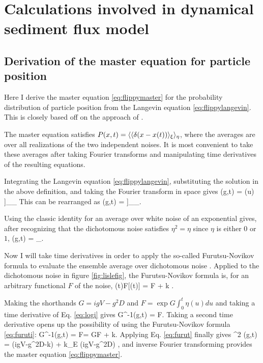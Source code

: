 
\chapter{Calculations involved in dynamical sediment flux model}
\label{sec:appendixAfluc}
\section{Derivation of the master equation for particle position}
\label{sec:appAmaster}
Here I derive the master equation \ref{eq:flippymaster} for the probability distribution of particle position from the Langevin equation \ref{eq:flippylangevin}. This is closely based off on the approach of \citet{Balakrishnan1993}.

The master equation satisfies $P(x,t) = \langle\langle \delta(x-x(t))\rangle_\xi \rangle_\eta$, where the averages are over all realizations of the two independent noises. It is most convenient to take these averages after taking Fourier transforms and manipulating time derivatives of the resulting equations.

Integrating the Langevin equation \ref{eq:flippylangevin}, substituting the solution in the above definition, and taking the Fourier transform in space gives
\be {}(g,t) = \Big\bra  \Big\bra \exp \Big[- i g \int_0^t du [V+\sqrt{2D}\xi(u)]\eta(u) \Big]\Big\ket_\eta \Big\ket_\xi\ee
This can be rearranged as
\be {}(g,t) = \Big\bra \exp{} \Big\bra \exp{}\Big]\Big\ket_\xi \Big\ket_\eta .\ee

Using the classic identity for an average over white noise of an exponential \citep{Balakrishnan1993,VanKampen2007} gives, after recognizing that the dichotomous noise satisfies $\eta^2 = \eta$ since $\eta$ is either $0$ or $1$,
\be {}(g,t) = \Big\bra \exp{}\Big\ket_\eta. \label{eq:logi}\ee

Now I will take time derivatives in order to apply the so-called Furutsu-Novikov formula to evaluate the ensemble average over dichotomous noise \citep{Shapiro1978}. Applied to the dichotomous noise in figure \ref{fig:lislefig}, the Furutsu-Novikov formula is, for an arbitrary functional $F$ of the noise,
\be \pt \bra \eta(t)F[\eta(t)] \ket = \bra \eta \pt F \ket + k   \label{eq:furuti}.\ee


Making the shorthands $G = igV-g^2D$ and $F=\exp G\int_0^t \eta(u)du$ and taking a time derivative of Eq. \ref{eq:logi} gives
\be G^{-1}\pt {}(g,t) = \bra \eta F\ket. \label{eq:furut}\ee
Taking a second time derivative opens up the possibility of using the Furutsu-Novikov formula \ref{eq:furuti}: 
\be G^{-1}\pt {}(g,t) = \pt \bra \eta F\ket = G\bra \eta F \ket + k. \ee
Applying Eq. \ref{eq:furut} finally gives
\be \pt^2 (g,t)  = (igV-g^2D-k)\pt  {} + k_E (igV-g^2D) ,\ee
and inverse Fourier transforming provides the master equation \ref{eq:flippymaster}.

